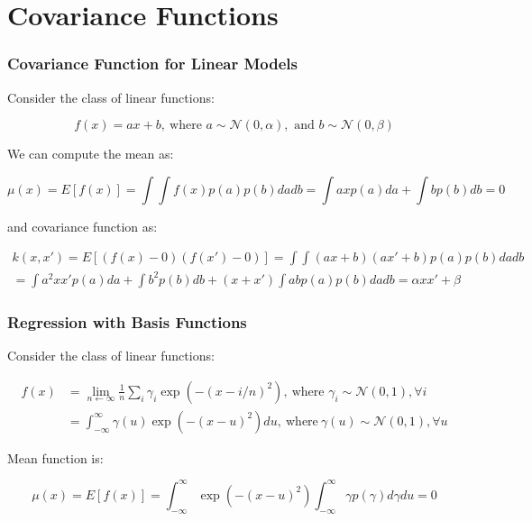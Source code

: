 \documentclass[10pt]{beamer}
\newcommand{\gaussN}{\mathcal{N}}
\begin{document}
  \section{Covariance Functions}

  \begin{frame}
    \frametitle{Covariance Function for Linear Models}
    Consider the class of linear functions:

    \begin{equation*}
      f(x) = ax + b,~\text{where } a \sim \gaussN(0,\alpha), \text{ and } b \sim \gaussN(0,\beta)
    \end{equation*}

    \pause

    We can compute the mean as:

    \begin{equation*}
      \mu(x) = E[f(x)] = \int \int f(x) p(a) p(b) da db = \int a x p(a) da + \int b p(b) db = 0
    \end{equation*}

    \pause

    and covariance function as:

    \begin{equation*}
      \begin{array}{c}
        k(x,x') = E[(f(x) - 0)(f(x') - 0)] = \int \int (ax+b)(ax'+b)p(a)p(b)dadb\\[0.2cm]
        = \int a^2 x x' p(a) da + \int b^2 p(b) db + (x + x') \int a b p(a) p(b) da db = \alpha x x' + \beta
      \end{array}
    \end{equation*}
  \end{frame}

  \begin{frame}
    \frametitle{Regression with Basis Functions}
    Consider the class of linear functions:

    \begin{equation*}
      \begin{array}{cc}
        f(x) & = \lim_{n \leftarrow \infty} \frac{1}{n} \sum_i \gamma_i \exp(-(x - i/n)^2),~\text{where } \gamma_i \sim \gaussN(0,1), \forall i \\[0.2cm]
        & = \int_{- \infty}^{\infty} \gamma(u) \exp(-(x - u)^2)du,~\text{where}~\gamma(u) \sim \gaussN(0,1), \forall u
      \end{array}
    \end{equation*}

    \pause

    Mean function is:

    \begin{equation*}
      \mu(x) = E[f(x)] = \int_{- \infty}^{\infty} \exp(-(x-u)^2) \int_{- \infty}^{\infty} \gamma p(\gamma) d\gamma du = 0
    \end{equation*}
  \end{frame}
\end{document}
